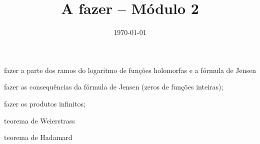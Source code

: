 \documentclass[12pt,a4paper]{article}
\title{A fazer -- Módulo 2}
\author{}
\date{\today}
\newcommand{\cmark}{\ding{51}}%
\newcommand{\done}{\rlap{$\square$}{\raisebox{2pt}{\large\hspace{1pt}\cmark}}%
\hspace{-2.5pt}}
\begin{document}
\maketitle

\begin{todolist}
    \item[\done] fazer a parte dos ramos do logaritmo de funções holomorfas
    e a fórmula de Jensen
    \item[\done] fazer as consequências da fórmula de Jensen (zeros de funções inteiras);
    \item[\done] fazer os produtos infinitos;
    \item teorema de Weierstrass
    \item teorema de Hadamard

\end{todolist}
\end{document}
